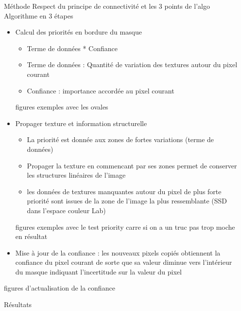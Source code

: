 \documentclass[final,hyperref={pdfpagelabels=false}]{beamer}
\begin{document}
\begin{frame}[t]
\begin{columns}[t]
\begin{column}{.02\textwidth} \end{column}
\end{columns}

\begin{columns}[t]

\begin{column}{.02\textwidth} \end{column}

\begin{column}{.465\textwidth} 


\begin{block}{Méthode}
Respect du principe de connectivité et les 3 points de l'algo 
Algorithme en 3 étapes 
\begin{itemize}
\item Calcul des priorités en bordure du masque
\begin{itemize}
\item Terme de données * Confiance
\item Terme de données : Quantité de variation des textures autour du pixel courant
\item Confiance : importance accordée au pixel courant
\end{itemize}
figures exemples avec les ovales 
\item Propager texture et information structurelle
\begin{itemize}
\item La priorité est donnée aux zones de fortes variations (terme de données)
\item Propager la texture en commencant par ses zones permet de conserver les structures linéaires de l'image
\item les données de textures manquantes autour du pixel de plus forte priorité sont issues de la zone de l'image la plus ressemblante (SSD dans l'espace couleur Lab)
\end{itemize}
figures exemples avec le test priority carre si on a un truc pas trop moche en résultat 
\item Mise à jour de la confiance : les nouveaux pixels copiés obtiennent la confiance du pixel courant de sorte que sa valeur diminue vers l'intérieur du masque indiquant l'incertitude sur la valeur du pixel
\end{itemize}

figures d'actualisation de la confiance 
\end{block}

\begin{block}{Résultats}



\end{block}
\end{column}
\end{columns}
\end{frame}
\end{document}

